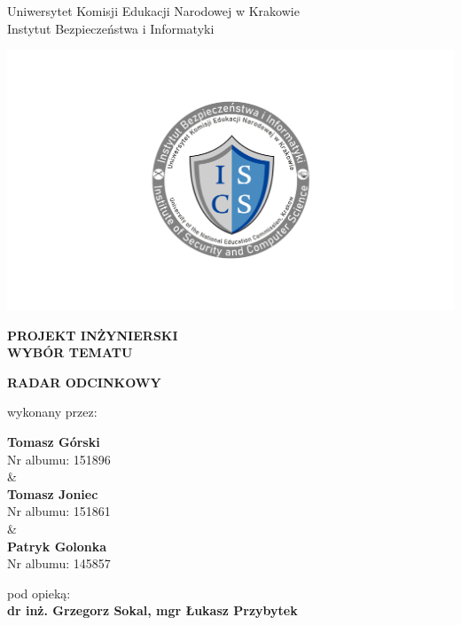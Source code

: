 \documentclass[12pt,a4paper,oneside]{article}
\theoremstyle{definition}
\numberwithin{equation}{section}
\begin{document}

\thispagestyle{empty}
\begin{titlepage}
\begin{center}\Large
Uniwersytet Komisji Edukacji Narodowej w Krakowie\\
\large
Instytut Bezpieczeństwa i Informatyki\\
\vskip 10pt
\end{center}
\begin{center}
\centering \includegraphics[width=1.0\columnwidth]{images/logo.png}
\end{center}

\begin{center}
 {\bf \fontsize{14pt}{14pt}\selectfont PROJEKT INŻYNIERSKI\\ WYBÓR TEMATU}
\end{center}
\vskip 5pt
\begin{center}
 {\bf \fontsize{22pt}{22pt}\selectfont RADAR ODCINKOWY}
\end{center}

\begin{center}
 {\fontsize{12pt}{12pt}\selectfont wykonany przez: }
\end{center}
\begin{center}
 {\bf\fontsize{16pt}{16pt}\selectfont Tomasz Górski}\\
 {\fontsize{12pt}{12pt}\selectfont Nr albumu: 151896 \\\&\\}
 {\bf\fontsize{16pt}{16pt}\selectfont Tomasz Joniec}\\
 {\fontsize{12pt}{12pt}\selectfont Nr albumu: 151861\\\&\\}
 {\bf\fontsize{16pt}{16pt}\selectfont Patryk Golonka}\\
 {\fontsize{12pt}{12pt}\selectfont Nr albumu: 145857}
\end{center}
\begin{center}
 {\fontsize{12pt}{12pt}\selectfont pod opieką:}\\
 {\bf\fontsize{12pt}{12pt}\selectfont dr inż. Grzegorz Sokal, mgr Łukasz Przybytek}
\end{center}


\end{titlepage}
\end{document}
